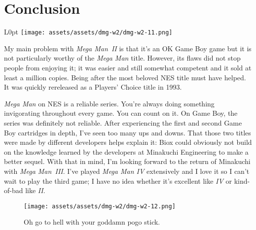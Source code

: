 \documentclass{book}
\begin{document}
\FloatBarrier\needspace{10mm}\section*{Conclusion}\nopagebreak[4]

\begin{wrapfigure}{L}{0pt} \texttt{[image: assets/assets/dmg-w2/dmg-w2-11.png]}\end{wrapfigure}
My main problem with \emph{Mega Man~II} is that it’s an OK Game Boy game but it is not particularly worthy of the \emph{Mega Man} title. However, its flaws did not stop people from enjoying it; it was easier and still somewhat competent and it sold at least a million copies. Being after the most beloved NES title must have helped. It was quickly rereleased as a Players’ Choice title in 1993.

\emph{Mega Man} on NES is a reliable series. You’re always doing something invigorating throughout every game. You can count on it. On Game Boy, the series was definitely not reliable. After experiencing the first and second Game Boy cartridges in depth, I’ve seen too many ups and downs. That those two titles were made by different developers helps explain it: Biox could obviously not build on the knowledge learned by the developers at Minakuchi Engineering to make a better sequel. With that in mind, I’m looking forward to the return of Minakuchi with \emph{Mega Man~III}. I’ve played \emph{Mega Man IV} extensively and I love it so I can’t wait to play the third game; I have no idea whether it’s excellent like \emph{IV} or kind-of-bad like \emph{II}.

\begin{figure}[hbt]
\vskip 10pt
\centering \texttt{[image: assets/assets/dmg-w2/dmg-w2-12.png]}\par\pagetwodescription Oh go to hell with your goddamn pogo stick.
\vskip 6pt
\end{figure}
\end{document}
